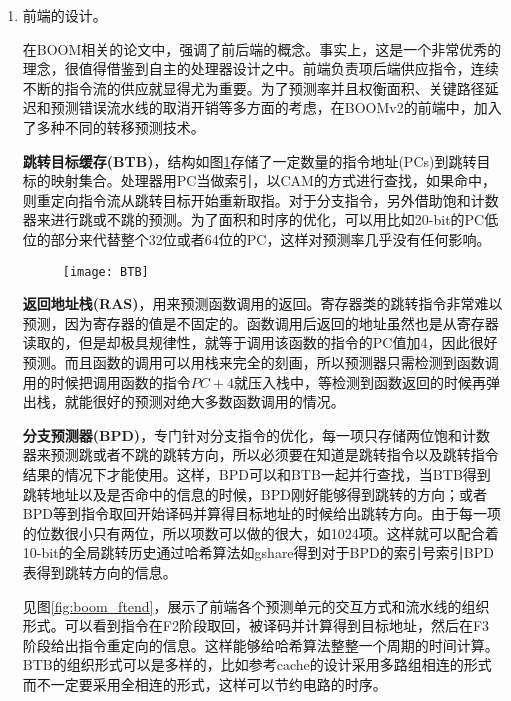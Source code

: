 \begin{enumerate}[label=(\alph*)]
	\item 前端的设计。
	
	在BOOM相关的论文\citep{Celio:EECS-2017-157,Celio:EECS-2018-151}中，强调了前后端的概念。事实上，这是一个非常优秀的理念，很值得借鉴到自主的处理器设计之中。前端负责项后端供应指令，连续不断的指令流的供应就显得尤为重要。为了预测率并且权衡面积、关键路径延迟和预测错误流水线的取消开销等多方面的考虑，在BOOMv2的前端中，加入了多种不同的转移预测技术。
	
	\textbf{跳转目标缓存(BTB)}，结构如图\ref{fig:BTB}存储了一定数量的指令地址(PCs)到跳转目标的映射集合。处理器用PC当做索引，以CAM的方式进行查找，如果命中，则重定向指令流从跳转目标开始重新取指。对于分支指令，另外借助饱和计数器来进行跳或不跳的预测。为了面积和时序的优化，可以用比如20-bit的PC低位的部分来代替整个32位或者64位的PC\citep{Celio:EECS-2017-157}，这样对预测率几乎没有任何影响。
	\begin{figure}[!htbp]
		\centering
		\texttt{[image: BTB]}
		\label{fig:BTB}
	\end{figure}

	\textbf{返回地址栈(RAS)}，用来预测函数调用的返回。寄存器类的跳转指令非常难以预测，因为寄存器的值是不固定的。函数调用后返回的地址虽然也是从寄存器读取的，但是却极具规律性，就等于调用该函数的指令的PC值加4，因此很好预测。而且函数的调用可以用栈来完全的刻画，所以预测器只需检测到函数调用的时候把调用函数的指令$ PC+4 $就压入栈中，等检测到函数返回的时候再弹出栈，就能很好的预测对绝大多数函数调用的情况。
	
	\textbf{分支预测器(BPD)}，专门针对分支指令的优化，每一项只存储两位饱和计数器来预测跳或者不跳的跳转方向，所以必须要在知道是跳转指令以及跳转指令结果的情况下才能使用。这样，BPD可以和BTB一起并行查找，当BTB得到跳转地址以及是否命中的信息的时候，BPD刚好能够得到跳转的方向；或者BPD等到指令取回开始译码并算得目标地址的时候给出跳转方向。由于每一项的位数很小只有两位，所以项数可以做的很大，如1024项。这样就可以配合着10-bit的全局跳转历史通过哈希算法如gshare得到对于BPD的索引号索引BPD表得到跳转方向的信息。
	
	见图\ref{fig:boom_ftend}，展示了前端各个预测单元的交互方式和流水线的组织形式。可以看到指令在F2阶段取回，被译码并计算得到目标地址，然后在F3阶段给出指令重定向的信息。这样能够给哈希算法整整一个周期的时间计算。BTB的组织形式可以是多样的，比如参考cache的设计采用多路组相连的形式而不一定要采用全相连的形式，这样可以节约电路的时序。
	

\end{enumerate}
